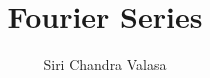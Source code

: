 \documentclass[journal,12pt,twocolumn]{IEEEtran}
\begin{document}
\newcommand{\solution}{\noindent \textbf{Solution: }}
\providecommand{\dec}[2]{\ensuremath{\overset{#1}{\underset{#2}{\gtrless}}}}
\makeatletter
{}
\makeatother
\let\StandardTheFigure\thefigure
\renewcommand{\thefigure}{\theproblem}
\def\putbox#1#2#3{\makebox[0in][l]{\makebox[#1][l]{}\raisebox{\baselineskip}[0in][0in]{\raisebox{#2}[0in][0in]{#3}}}}
\def\rightbox#1{\makebox[0in][r]{#1}}
\def\centbox#1{\makebox[0in]{#1}}
\def\topbox#1{\raisebox{-\baselineskip}[0in][0in]{#1}}
\def\midbox#1{\raisebox{-0.5\baselineskip}[0in][0in]{#1}}
\vspace{3cm}
\title{
Fourier Series
}
%
%
%
\author{ Siri Chandra Valasa
}
% 
%
\end{document}
